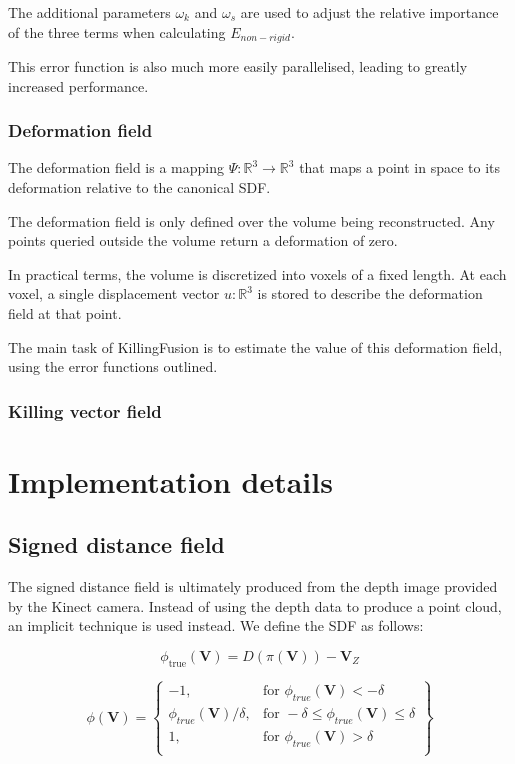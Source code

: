 \documentclass[12pt,twoside]{report}
\begin{document}
The additional parameters $\omega_k$ and $\omega_s$ are used to adjust the relative importance of the three terms when calculating $E_{non-rigid}$.

This error function is also much more easily parallelised, leading to greatly increased performance.\\



\subsection{Deformation field}

The deformation field is a mapping $\Psi : \mathbb{R}^3 \rightarrow \mathbb{R}^3$ that maps a point in space to its deformation relative to the canonical SDF.

The deformation field is only defined over the volume being reconstructed. Any points queried outside the volume return a deformation of zero.

In practical terms, the volume is discretized into voxels of a fixed length. At each voxel, a single displacement vector $u : \mathbb{R}^3$ is stored to describe the deformation field at that point.

The main task of KillingFusion is to estimate the value of this deformation field, using the error functions outlined.

\subsection{Killing vector field}

\chapter{Implementation details}


\section{Signed distance field}

The signed distance field is ultimately produced from the depth image provided by the Kinect camera. 
Instead of using the depth data to produce a point cloud, an implicit technique is used instead.
We define the SDF as follows:

$$\phi_{\text{true}}(\textbf{V}) = D(\pi(\textbf{V})) - \textbf{V}_Z$$

\[
    \phi(\textbf{V}) = \left\{\begin{array}{lr}
    -1,                    & \text{for } \phi_{true}(\textbf{V}) < - \delta\\
    \phi_{true}(\textbf{V}) / \delta, & \text{for } -\delta \leq \phi_{true}(\textbf{V}) \leq \delta \\
    1,                     & \text{for } \phi_{true}(\textbf{V}) > \delta\\
    \end{array}\right\}
\]
\end{document}
